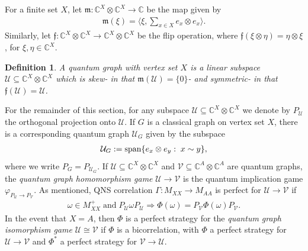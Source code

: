 \documentclass[11pt]{amsart}
\newtheorem{definition}[theorem]{Definition}
\newcommand{\cl}[1]{\mathcal{#1}}
\newcommand{\bb}[1]{\mathbb{#1}}
\begin{document}
For a finite set $X$, let $\mathfrak{m}: \bb{C}^{X}\otimes \bb{C}^{X}\rightarrow \bb{C}$ be the map given by
\begin{gather*}
	\mathfrak{m}(\xi) = \bigg\langle \xi, \sum\limits_{x \in X}e_{x}\otimes e_{x}\bigg\rangle. 
\end{gather*}
\noindent Similarly, let $\mathfrak{f}: \bb{C}^{X}\otimes \bb{C}^{X}\rightarrow \bb{C}^{X}\otimes \bb{C}^{X}$ be the flip operation, where $\mathfrak{f}(\xi\otimes \eta) = \eta\otimes \xi$, for $\xi, \eta \in \bb{C}^{X}$.
\begin{definition}\label{quantum_graph}
A quantum graph with vertex set $X$ is a linear subspace $\cl{U} \subseteq \bb{C}^{X}\otimes \bb{C}^{X}$ which is skew- in that $\mathfrak{m}(\cl{U}) = \{0\}$- and symmetric- in that $\mathfrak{f}(\cl{U}) = \cl{U}$.
\end{definition}
\noindent \indent For the remainder of this section, for any subspace $\cl{U} \subseteq \bb{C}^{X}\otimes \bb{C}^{X}$ we denote by $P_{\cl{U}}$ the orthogonal projection onto $\cl{U}$. If $G$ is a classical graph on vertex set $X$, there is a corresponding quantum graph $\cl{U}_{G}$ given by the subspace 
\begin{gather*}
	\cl{U}_{G} := {\rm span}\{e_{x}\otimes e_{y}: \; x\sim y\},
\end{gather*}
\noindent where we write $P_{G} = P_{\cl{U}_{G}}$. If $\cl{U} \subseteq \bb{C}^{X}\otimes \bb{C}^{X}$ and $\cl{V} \subseteq \bb{C}^{A}\otimes \bb{C}^{A}$ are quantum graphs, the \textit{quantum graph homomorphism game} $\cl{U}\rightarrow \cl{V}$ is the quantum implication game $\varphi_{P_{\cl{U}}\rightarrow P_{\cl{V}}}$. As mentioned, QNS correlation $\Gamma: M_{XX}\rightarrow M_{AA}$ is perfect for $\cl{U}\rightarrow \cl{V}$ if 
\begin{gather*}
	\omega \in M_{XX}^{+} \; \text{and} \; P_{\cl{U}}\omega P_{\cl{U}} \Rightarrow \Phi(\omega) = P_{\cl{V}}\Phi(\omega)P_{\cl{V}}.
\end{gather*}
\noindent In the event that $X = A$, then $\Phi$ is a perfect strategy for the \textit{quantum graph isomorphism game} $\cl{U} \cong \cl{V}$ if $\Phi$ is a bicorrelation, with $\Phi$ a perfect strategy for $\cl{U}\rightarrow \cl{V}$ and $\Phi^{*}$ a perfect strategy for $\cl{V}\rightarrow \cl{U}$. 
\end{document}
